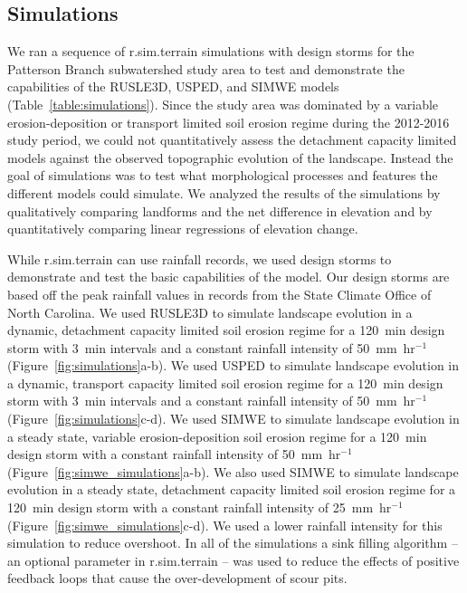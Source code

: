 \documentclass[gmd, manuscript]{copernicus}
\begin{document}
\subsection{Simulations}
%
We ran a sequence of r.sim.terrain simulations 
with design storms
for the Patterson Branch subwatershed study area
to test and demonstrate the capabilities 
of the RUSLE3D, USPED, and SIMWE models
(Table~\ref{table:simulations}).
%
Since the study area was dominated by
a variable erosion-deposition or transport limited
soil erosion regime during the 2012-2016 study period, 
we could not quantitatively assess 
the detachment capacity limited models
against the observed topographic evolution of the landscape.
%
Instead the goal of simulations was to test
what morphological processes and features 
the different models could simulate. 
%
We analyzed the results of the simulations 
by qualitatively comparing landforms 
and the net difference in elevation
and by quantitatively comparing 
linear regressions of elevation change.

While r.sim.terrain can use rainfall records,
we used design storms to demonstrate and test 
the basic capabilities of the model. 
Our design storms are based off the peak rainfall values
in records from the State Climate Office of North Carolina.
We used RUSLE3D to simulate landscape evolution
in a dynamic, detachment capacity limited soil erosion regime
for a 120~\unit{min} design storm
with 3~\unit{min} intervals 
and a constant rainfall intensity of 50~\unit{mm~hr}$^{-1}$
(Figure~\ref{fig:simulations}a-b).
%
We used USPED to simulate landscape evolution
in a dynamic, transport capacity limited soil erosion regime
for a 120~\unit{min} design storm
with 3~\unit{min} intervals 
and a constant rainfall intensity of 50~\unit{mm~hr}$^{-1}$
(Figure~\ref{fig:simulations}c-d).
%
We used SIMWE to simulate landscape evolution
in a steady state, variable erosion-deposition soil erosion regime
for a 120~\unit{min} design storm
with a constant rainfall intensity of 50~\unit{mm~hr}$^{-1}$
(Figure~\ref{fig:simwe_simulations}a-b). 
%
We also used SIMWE to simulate landscape evolution
in a steady state, detachment capacity limited soil erosion regime
for a 120~\unit{min} design storm
with a constant rainfall intensity of 25~\unit{mm~hr}$^{-1}$
(Figure~\ref{fig:simwe_simulations}c-d).
We used a lower rainfall intensity for this simulation 
to reduce overshoot.
%
In all of the simulations 
a sink filling algorithm
-- an optional parameter in r.sim.terrain -- 
was used to reduce the effects of positive feedback loops
that cause the over-development of scour pits. 
\end{document}
